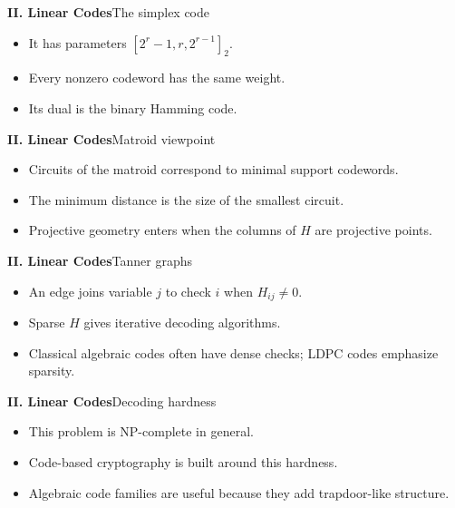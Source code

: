 \begin{frame}{\textbf{II. Linear Codes}}{The simplex code}
\small
{}
\begin{itemize}
  \item It has parameters $[2^r-1,r,2^{r-1}]_2$.
  \item Every nonzero codeword has the same weight.
  \item Its dual is the binary Hamming code.
\end{itemize}
\end{frame}

\begin{frame}{\textbf{II. Linear Codes}}{Matroid viewpoint}
\small
{}
\begin{itemize}
  \item Circuits of the matroid correspond to minimal support codewords.
  \item The minimum distance is the size of the smallest circuit.
  \item Projective geometry enters when the columns of $H$ are projective points.
\end{itemize}
\end{frame}

\begin{frame}{\textbf{II. Linear Codes}}{Tanner graphs}
\small
{}
\begin{itemize}
  \item An edge joins variable $j$ to check $i$ when $H_{ij}\ne0$.
  \item Sparse $H$ gives iterative decoding algorithms.
  \item Classical algebraic codes often have dense checks; LDPC codes emphasize sparsity.
\end{itemize}
\end{frame}

\begin{frame}{\textbf{II. Linear Codes}}{Decoding hardness}
\small
{}
\begin{itemize}
  \item This problem is NP-complete in general.
  \item Code-based cryptography is built around this hardness.
  \item Algebraic code families are useful because they add trapdoor-like structure.
\end{itemize}
\end{frame}

